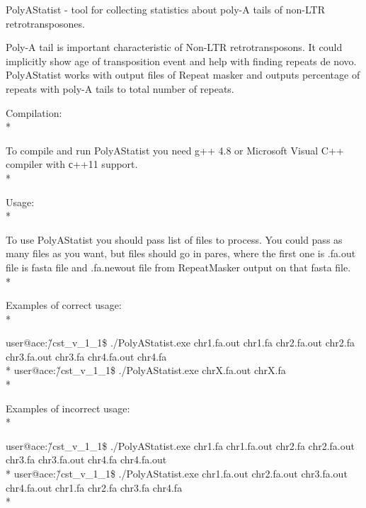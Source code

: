 \documentclass[12pt]{article}
\begin{document}
\begin{center}
\begin{Large}
PolyAStatist - tool for collecting statistics about poly-A tails of non-LTR retrotransposones.
\end{Large}
\end{center}

Poly-A tail is important characteristic of Non-LTR retrotransposons. It could implicitly show age of transposition event and help with finding repeats de novo.
PolyAStatist works with output files of Repeat masker and outputs percentage of repeats with poly-A tails to total number of repeats. \\

\begin{Large}
Compilation: \\*
\end{Large}
To compile and run PolyAStatist you need g++ 4.8 or Microsoft Visual C++ compiler with с++11 support.  \\*

\begin{Large}
Usage: \\*
\end{Large}
To use PolyAStatist you should pass list of files to process. You could pass as many files as you want, but files should go in pares, where the first one is .fa.out file is fasta file and .fa.newout file from RepeatMasker output on that fasta file. \\*

\begin{Large}
Examples of correct usage: \\*
\end{Large}
user@ace:\~/cst\_v\_1\_1\$ ./PolyAStatist.exe chr1.fa.out chr1.fa chr2.fa.out chr2.fa chr3.fa.out  chr3.fa chr4.fa.out chr4.fa \\*
user@ace:\~/cst\_v\_1\_1\$ ./PolyAStatist.exe chrX.fa.out chrX.fa \\*

\begin{Large}
Examples of incorrect usage: \\*
\end{Large}
user@ace:\~/cst\_v\_1\_1\$ ./PolyAStatist.exe chr1.fa chr1.fa.out  chr2.fa chr2.fa.out chr3.fa chr3.fa.out  chr4.fa chr4.fa.out \\*
user@ace:\~/cst\_v\_1\_1\$ ./PolyAStatist.exe chr1.fa.out chr2.fa.out chr3.fa.out chr4.fa.out chr1.fa chr2.fa chr3.fa chr4.fa \\*
\end{document}
